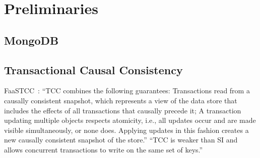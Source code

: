 
\section{Preliminaries}  \label{section:preliminaries}

\subsection{MongoDB} \label{ss:mongodb}

\subsection{Transactional Causal Consistency} \label{ss:tcc}

FaaSTCC~\cite{FaaSTCC:Middleware2021}:
``TCC combines the following guarantees: Transactions read from a causally consistent snapshot,
which represents a view of the data store that includes the effects of all transactions that causally precede it;
A transaction updating multiple objects respects atomicity, i.e., all updates occur and are made visible simultaneously,
or none does. Applying updates in this fashion creates a new causally consistent snapshot of the store.''
``TCC is weaker than SI and allows concurrent transactions to write on the same set of keys.''
